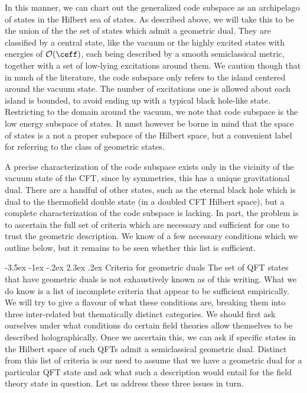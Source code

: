 \documentclass[12pt,openany]{book}
\makeatletter
\renewcommand\section{\@startsection {section}{1}{\z@}%
                                   {-3.5ex \@plus -1ex \@minus -.2ex}%
                                   {2.3ex \@plus.2ex}%
                                   {\normalfont\large\bfseries}}
\makeatother
\begin{document}
 In this manner, we can chart out the generalized code subspace as an archipelago of states in the Hilbert sea of states. As described above, we will take this to be  the union of the the set of states which admit a geometric dual. They are classified by a central state, like the vacuum or the highly excited states with energies of ${\cal O}(\ceff)$, each being described by a smooth semiclassical metric,  together with a set of low-lying excitations around them. We caution though that in much of the literature, the code subspace only refers to the island centered around the vacuum state. The number of excitations one is allowed about each island is bounded, to avoid ending up with a typical black hole-like state. Restricting to the domain around the vacuum, we note that  code subspace is the low energy subspace of states. It must however be borne in mind that the space of states is a not a proper subspace of the Hilbert space, but a convenient label for referring to the class of geometric states.

A precise characterization of the code subspace exists only in the vicinity of the vacuum state of the CFT, since by symmetries, this has a unique gravitational dual. There are a handful of other states, such as the eternal black hole which is dual to the thermofield double state (in a doubled CFT Hilbert space), but a complete characterization of the code subspace is lacking. In part, the problem is to ascertain the full set of criteria which are necessary and sufficient for one to trust the geometric description. We know of a few necessary conditions which we outline below, but it remains to be seen whether this list is sufficient.

\section{Criteria for geometric duals}
\label{sec:critgeom}
The set of QFT states that have geometric duals is not exhaustively known as of this writing. What we do know is a list of incomplete criteria that appear to be sufficient empirically. We will try to give a flavour of what these conditions are, breaking them into three inter-related but thematically distinct categories.
We should first ask ourselves under what conditions do certain field theories allow themselves to be described holographically. Once we ascertain this, we can ask if specific states in the Hilbert space of such QFTs admit a semiclassical geometric dual. Distinct from this list of criteria is our need to assume that we have a geometric dual for a particular QFT state and ask what such a description would entail for the field theory state in question. Let us address these three issues in turn.
\end{document}
